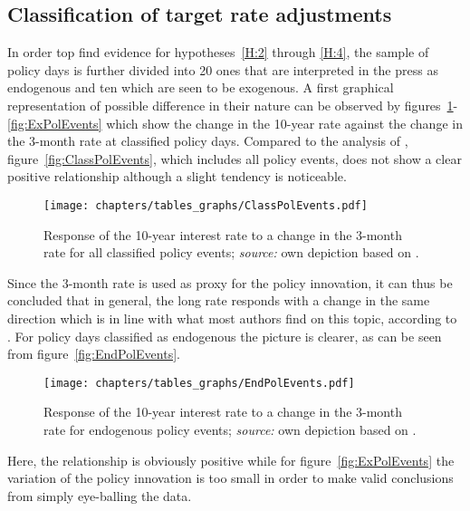 \subsection{Classification of target rate adjustments}

In order top find evidence for hypotheses~\ref{H:2} through \ref{H:4}, the sample of policy days is further divided into 20 ones that are interpreted in the press as endogenous and ten which are seen to be exogenous. A first graphical representation of possible difference in their nature can be observed by figures~\ref{fig:ClassPolEvents}-\ref{fig:ExPolEvents} which show the change in the 10-year rate against the change in the 3-month rate at classified policy days. Compared to the analysis of \textcite{Ellingsen.2003}, figure~\vref{fig:ClassPolEvents}, which includes all policy events, does not show a clear positive relationship although a slight tendency is noticeable. 
\begin{figure}[htbp]
	\centering
	\texttt{[image: chapters/tables\_graphs/ClassPolEvents.pdf]} 
	\caption[Response of the 10-year interest rate to a change in the 3-month rate for all classified policy events.]{Response of the 10-year interest rate to a change in the 3-month rate for all classified policy events; \textit{source:} own depiction based on \textcite{Ellingsen.2003}.}
	\label{fig:ClassPolEvents}
\end{figure}
%
Since the 3-month rate is used as proxy for the policy innovation, it can thus be concluded that in general, the long rate responds with a change in the same direction which is in line with what most authors find on this topic, according to \textcite{Ellingsen.2003}. For policy days classified as endogenous the picture is clearer, as can be seen from figure~\vref{fig:EndPolEvents}.
\begin{figure}[htbp]
	\centering
	\texttt{[image: chapters/tables\_graphs/EndPolEvents.pdf]} 
	\caption[Response of the 10-year interest rate to a change in the 3-month rate for endogenous policy events.]{Response of the 10-year interest rate to a change in the 3-month rate for endogenous policy events; \textit{source:} own depiction based on \textcite{Ellingsen.2003}.}
	\label{fig:EndPolEvents}
\end{figure}
%
Here, the relationship is obviously positive while for figure~\vref{fig:ExPolEvents} the variation of the policy innovation is too small in order to make valid conclusions from simply eye-balling the data.
